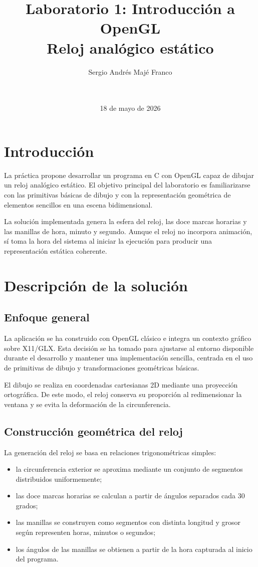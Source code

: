 \documentclass[12pt,a4paper]{article}
\title{\textbf{Laboratorio 1: Introducción a OpenGL}\\Reloj analógico estático}
\author{Sergio Andrés Majé Franco}
\date{\Asignatura \\ \Universidad \\ 18 de mayo de 2026}
\begin{document}
\maketitle
\tableofcontents
\newpage

\section{Introducción}
La práctica propone desarrollar un programa en C con OpenGL capaz de dibujar un reloj analógico estático. El objetivo principal del laboratorio es familiarizarse con las primitivas básicas de dibujo y con la representación geométrica de elementos sencillos en una escena bidimensional.

La solución implementada genera la esfera del reloj, las doce marcas horarias y las manillas de hora, minuto y segundo. Aunque el reloj no incorpora animación, sí toma la hora del sistema al iniciar la ejecución para producir una representación estática coherente.

\section{Descripción de la solución}
\subsection{Enfoque general}
La aplicación se ha construido con OpenGL clásico e integra un contexto gráfico sobre X11/GLX. Esta decisión se ha tomado para ajustarse al entorno disponible durante el desarrollo y mantener una implementación sencilla, centrada en el uso de primitivas de dibujo y transformaciones geométricas básicas.

El dibujo se realiza en coordenadas cartesianas 2D mediante una proyección ortográfica. De este modo, el reloj conserva su proporción al redimensionar la ventana y se evita la deformación de la circunferencia.

\subsection{Construcción geométrica del reloj}
La generación del reloj se basa en relaciones trigonométricas simples:

\begin{itemize}[leftmargin=*]
    \item la circunferencia exterior se aproxima mediante un conjunto de segmentos distribuidos uniformemente;
    \item las doce marcas horarias se calculan a partir de ángulos separados cada 30 grados;
    \item las manillas se construyen como segmentos con distinta longitud y grosor según representen horas, minutos o segundos;
    \item los ángulos de las manillas se obtienen a partir de la hora capturada al inicio del programa.
\end{itemize}
\end{document}
